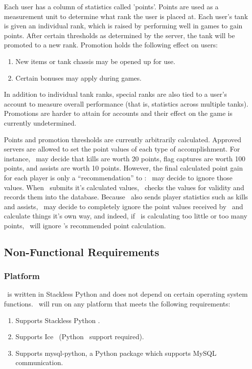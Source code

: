 Each user has a column of statistics called 'points'. Points are used as a measurement unit to determine what rank the user is placed at. Each user's tank is given an individual rank, which is raised by performing well in games to gain points. After certain thresholds as determined by the server, the tank will be promoted to a new rank. Promotion holds the following effect on users:
\begin{enumerate}
	\item New items or tank chassis may be opened up for use.
	\item Certain bonuses may apply during games.
\end{enumerate}
In addition to individual tank ranks, special ranks are also tied to a user's account to measure overall performance (that is, statistics across multiple tanks). Promotions are harder to attain for accounts and their effect on the game is currently undetermined.

Points and promotion thresholds are currently arbitrarily calculated. Approved servers are allowed to set the point values of each type of accomplishment. For instance, \GameServer\ may decide that kills are worth 20 points, flag captures are worth 100 points, and assists are worth 10 points. However, the final calculated point gain for each player is only a ``recommendation'' to \MainServer: \MainServer\ may decide to ignore those values. When \GameServer\ submits it's calculated values, \MainServer\ checks the values for validity and records them into the database. Because \GameServer\ also sends player statistics such as kills and assists, \MainServer\ may decide to completely ignore the point values received by \GameServer\ and calculate things it's own way, and indeed, if \GameServer\ is calculating too little or too many points, \MainServer\ will ignore \GameServer's recommended point calculation.

\subsection{Non-Functional Requirements}

\subsubsection*{Platform}

\MainServer\ is written in Stackless Python and does not depend on certain operating system functions. \MainServer\ will run on any platform that meets the following requirements:
\begin{enumerate}
\item Supports Stackless Python \StacklessPythonVersion.
\item Supports Ice \IceVersion\ (Python \StacklessPythonVersion\ support required).
\item Supports mysql-python, a Python package which supports MySQL communication.
\end{enumerate}

